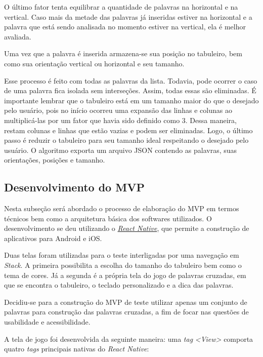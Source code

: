O último fator tenta equilibrar a quantidade de palavras na horizontal e na vertical. Caso mais da metade das palavras já inseridas estiver na horizontal e a palavra que está sendo analisada no momento estiver na vertical, ela é melhor avaliada.

Uma vez que a palavra é inserida armazena-se sua posição no tabuleiro, bem como sua orientação vertical ou horizontal e seu tamanho.

Esse processo é feito com todas as palavras da lista. Todavia, pode ocorrer o caso de uma palavra fica isolada sem interseções. Assim, todas essas são eliminadas. É importante lembrar que o tabuleiro está em um tamanho maior do que o desejado pelo usuário, pois no início ocorreu uma expansão das linhas e colunas ao multiplicá-las por um fator que havia sido definido como 3. Dessa maneira, restam colunas e linhas que estão vazias e podem ser eliminadas. Logo, o último passo é reduzir o tabuleiro para seu tamanho ideal respeitando o desejado pelo usuário. O algoritmo exporta um arquivo JSON contendo as palavras, suas orientações, posições e tamanho.

\subsection{Desenvolvimento do MVP}
Nesta subseção será abordado o processo de elaboração do MVP em termos técnicos bem como a arquitetura básica dos softwares utilizados.
O desenvolvimento se deu utilizando o   \textit{\href{https://reactnative.dev/}{React Native}}, que permite a construção de aplicativos para Android e iOS.

Duas telas foram utilizadas para o teste interligadas por uma navegação em \textit{Stack}. A primeira possibilita a escolha do tamanho do tabuleiro bem como o tema de cores. Já a segunda é a própria tela do jogo de palavras cruzadas, em que se encontra o tabuleiro, o teclado personalizado e a dica das palavras.

Decidiu-se para a construção do MVP de teste utilizar apenas um conjunto de palavras para construção das palavras cruzadas, a fim de focar nas questões de usabilidade e acessibilidade.

A tela de jogo foi desenvolvida da seguinte maneira: uma \textit{tag} \textit{<View>} comporta quatro \textit{tags} principais nativas do \textit{React Native}:

